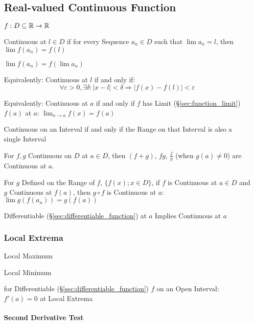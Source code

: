 \subsection{Real-valued Continuous Function}\label{sec:real_continuous}

$f : D \subseteq \mathbb{R} \rightarrow \mathbb{R}$

Continuous at $l \in D$ if for every Sequence $a_n \in D$ such that
$\lim a_n = l$, then $\lim f(a_n) = f(l)$

$\lim f (a_n) = f (\lim a_n)$

Equivalently: Continuous at $l$ if and only if:
\[
  \forall \varepsilon > 0, \exists \delta :
  |x - l| < \delta \Rightarrow |f(x) - f(l)| < \varepsilon
\]

Equivalently: Continuous at $a$ if and only if $f$ has Limit
(\S\ref{sec:function_limit}) $f(a)$ at $a$: $\lim_{x \rightarrow
  a}f(x) = f(a)$

Continuous on an Interval if and only if the Range on that Interval is
also a single Interval

For $f,g$ Continuous on $D$ at $a \in D$, then $(f + g)$, $f g$,
$\frac{f}{g}$ (when $g(a) \neq 0$) are Continuous at $a$.

For $g$ Defined on the Range of $f$, $\{ f(x); x \in D\}$, if $f$ is
Continuous at $a \in D$ and $g$ Continuous at $f(a)$, then $g \circ f$
is Continuous at $a$: $\lim g(f(a_n)) = g(f(a))$

Differentiable (\S\ref{sec:differentiable_function}) at $a$ Implies
Continuous at $a$



\subsubsection{Local Extrema}\label{sec:local_extrema}

Local Maximum

Local Minimum

for Differentiable (\S\ref{sec:differentiable_function}) $f$ on an
Open Interval: $f'(a) = 0$ at Local Extrema



\paragraph{Second Derivative Test}\label{sec:second_derivative_test}\hfill



